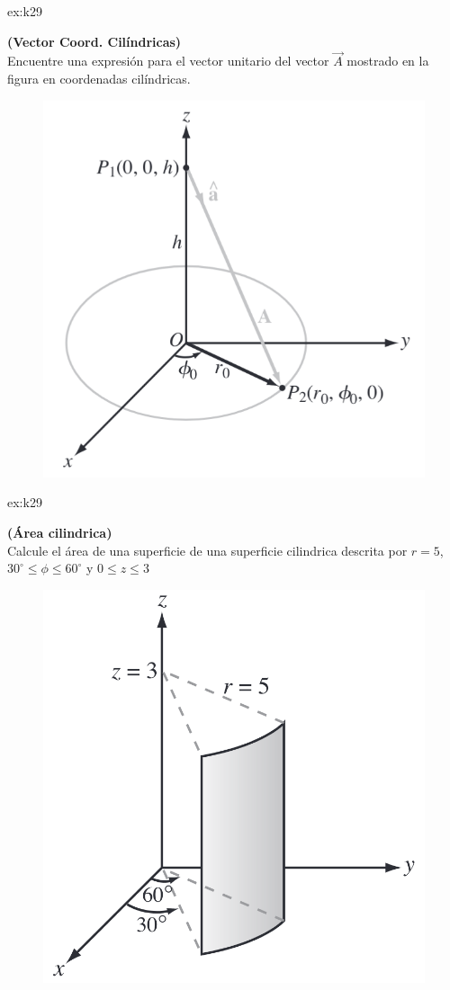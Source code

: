  \begin{multicols}{2}

 
    \begin{excercise}[][][$\vec{e}_A=\displaystyle{\frac{r_0\vec{e}_r-h\vec{k}}{\sqrt{r_0^2+h^2}}}$]{ex:k29}{
        \textbf{(Vector Coord. Cilíndricas)}\\
        Encuentre una expresión para el vector unitario del vector $\vec{A}$ mostrado en la figura en coordenadas cilíndricas.
        \begin{figure}[H]
            \centering
            \includegraphics[width=0.7\linewidth]{img/01_electric-field/1.png}
        \end{figure}
    }
    \end{excercise}

    \begin{excercise}[][][$S=\displaystyle{\frac{5\pi}{2}}$]{ex:k29}{ \textbf{(Área cilindrica)}\\
    Calcule el área de una superficie de una superficie cilindrica descrita por $r=5$, $30^\circ\leq\phi\leq 60^\circ$ y $0\leq z\leq 3$            
    \begin{figure}[H]
                \centering
                \includegraphics[width=0.7\linewidth]{img/01_electric-field/2.png}
            \end{figure}
         }
    \end{excercise}


\end{multicols}
